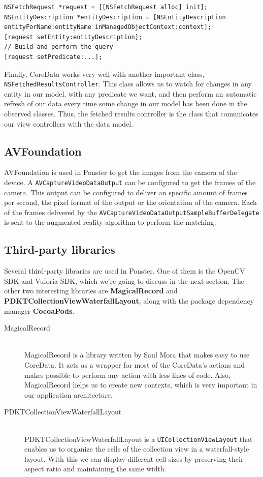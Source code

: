 \begin{verbatim}
NSFetchRequest *request = [[NSFetchRequest alloc] init];
NSEntityDescription *entityDescription = [NSEntityDescription
entityForName:entityName inManagedObjectContext:context];
[request setEntity:entityDescription];
// Build and perform the query
[request setPredicate:...];
\end{verbatim}

Finally, CoreData works very well with another important class,
\texttt{NSFetched\-Results\-Controller}. This class allows us to watch for changes in
any entity in our model, with any predicate we want, and then perform an automatic
refresh of our data every time some change in our model has been done in the
observed classes. Thus, the fetched results controller is the class that comunicates
our view controllers with the data model.

\subsection{AVFoundation}
AVFoundation is used in Ponster to get the images from the camera of the device. A
\texttt{AVCaptureVideoDataOutput} can be configured to get the frames of the
camera. This output can be configured to deliver an specific amount of frames per
second, the pixel format of the output or the orientation of the camera. Each of the
frames delivered by the \texttt{AVCaptureVideoDataOutputSample\-Buffer\-Delegate} is
sent to the augmented reality algorithm to perform the matching.

\subsection{Third-party libraries}
Several third-party libraries are used in Ponster. One of them is the OpenCV SDK and
Vuforia SDK, which we're going to discuss in the next section. The other two
interesting libraries are \textbf{MagicalRecord} and
\textbf{PDKTCollectionViewWaterfallLayout}, along with the package dependency
manager \textbf{CocoaPods}.

\begin{description}
\item [MagicalRecord] \hfill \\
MagicalRecord\cite{gh:mr} is a library written by Saul Mora that makes easy to use
CoreData. It acts as a wrapper for most of the CoreData's actions and makes possible
to perform any action with less lines of code. Also, MagicalRecord helps us to create new
contexts, which is very important in our application architecture.
\item [PDKTCollectionViewWaterfallLayout] \hfill \\
PDKTCollectionViewWaterfallLayout is a \texttt{UICollectionViewLayout} that enables
us to organize the cells of the collection view in a waterfall-style layout. With
this we can display different cell sizes by preserving their aspect ratio and
maintaining the same width.
\end{description}

